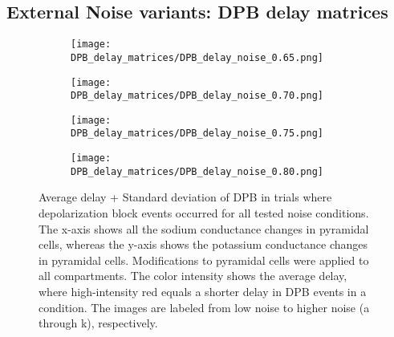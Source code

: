 \subsection{External Noise variants: DPB delay matrices}\label{subsec:DPB_delay_matrices}
\begin{figure}[H]
    \centering
    \begin{subfigure}{0.48\textwidth}
        \texttt{[image: DPB\_delay\_matrices/DPB\_delay\_noise\_0.65.png]}
        \caption{} %
    \end{subfigure}\hfill
    \begin{subfigure}{0.48\textwidth}
        \texttt{[image: DPB\_delay\_matrices/DPB\_delay\_noise\_0.70.png]}
        \caption{} %
    \end{subfigure}

    \bigskip %

    \begin{subfigure}{0.48\textwidth}
        \texttt{[image: DPB\_delay\_matrices/DPB\_delay\_noise\_0.75.png]}
        \caption{} %
    \end{subfigure}\hfill
    \begin{subfigure}{0.48\textwidth}
        \texttt{[image: DPB\_delay\_matrices/DPB\_delay\_noise\_0.80.png]}
        \caption{} %
    \end{subfigure}

    \caption[DPB delay matrices (all)]{Average delay + Standard deviation of DPB in trials where depolarization block events occurred for all tested noise conditions.
        The x-axis shows all the sodium conductance changes in pyramidal cells, whereas the y-axis shows the potassium conductance changes in pyramidal cells.
        Modifications to pyramidal cells were applied to all compartments.
        The color intensity shows the average delay, where high-intensity red equals a shorter delay in DPB events in a condition.
        The images are labeled from low noise to higher noise (a through k), respectively.}\label{fig:dpb_delay_matrices_all}
\end{figure}

